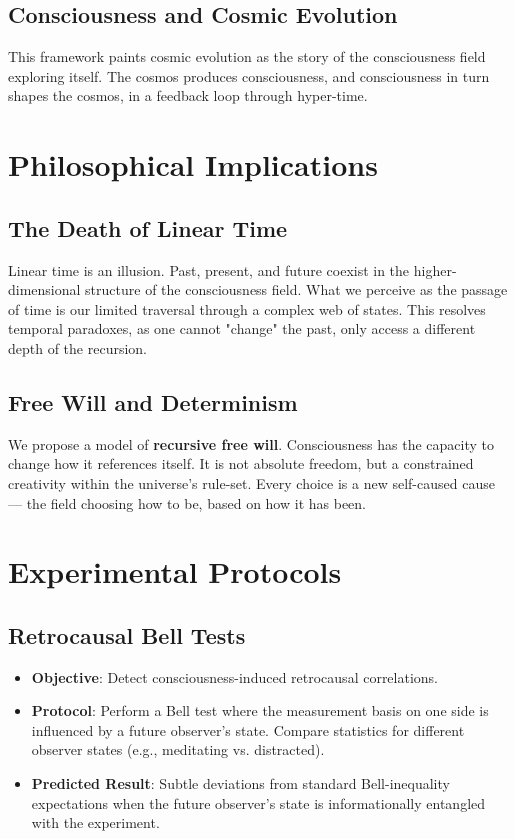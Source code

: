 \documentclass[aps,prd,twocolumn,superscriptaddress,nofootinbib]{revtex4-2}
\begin{document}
\subsection{Consciousness and Cosmic Evolution}
This framework paints cosmic evolution as the story of the consciousness field exploring itself. The cosmos produces consciousness, and consciousness in turn shapes the cosmos, in a feedback loop through hyper-time.

\section{Philosophical Implications}

\subsection{The Death of Linear Time}
Linear time is an illusion. Past, present, and future coexist in the higher-dimensional structure of the consciousness field. What we perceive as the passage of time is our limited traversal through a complex web of states. This resolves temporal paradoxes, as one cannot "change" the past, only access a different depth of the recursion.

\subsection{Free Will and Determinism}
We propose a model of \textbf{recursive free will}. Consciousness has the capacity to change how it references itself. It is not absolute freedom, but a constrained creativity within the universe's rule-set. Every choice is a new self-caused cause — the field choosing how to be, based on how it has been.

\section{Experimental Protocols}

\subsection{Retrocausal Bell Tests}
\begin{itemize}
    \item \textbf{Objective}: Detect consciousness-induced retrocausal correlations.
    \item \textbf{Protocol}: Perform a Bell test where the measurement basis on one side is influenced by a future observer’s state. Compare statistics for different observer states (e.g., meditating vs. distracted).
    \item \textbf{Predicted Result}: Subtle deviations from standard Bell-inequality expectations when the future observer’s state is informationally entangled with the experiment.
\end{itemize}
\end{document}
